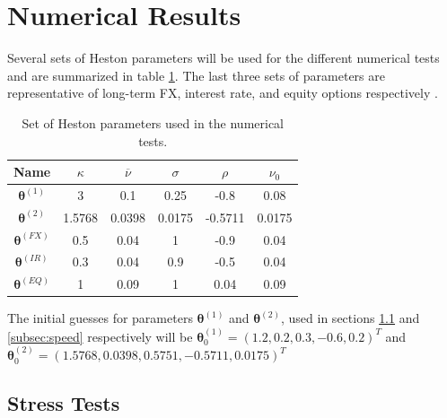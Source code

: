 \documentclass[12,twoside]{mammeTFM}
\theoremstyle{definition}
\theoremstyle{remark}
\begin{document}


\section{Numerical Results} \label{chapter:results}

Several sets of Heston parameters will be used for the different numerical tests and are summarized in table \ref{table:heston_params}. The last three sets of parameters are representative of long-term FX, interest rate, and equity options respectively \cite{and08}.

\begin{table}[h]
\begin{center}
 \begin{tabular}{|c | c | c | c | c | c |} 
 \hline
 Name & $\kappa$ & $\overline{\nu}$ & $\sigma$ & $\rho$ & $\nu_0$ \\ [0.5ex] 
 \hline
 $\boldsymbol{\theta}^{(1)}$ & 3 & 0.1 & 0.25 & -0.8 & 0.08 \\ 
 \hline
 $\boldsymbol{\theta}^{(2)}$ & 1.5768 & 0.0398 & 0.0175 & -0.5711 & 0.0175 \\ 
 \hline
 $\boldsymbol{\theta}^{(FX)}$ & 0.5 & 0.04 & 1 & -0.9 & 0.04 \\ 
 \hline
 $\boldsymbol{\theta}^{(IR)}$ & 0.3 & 0.04 & 0.9 & -0.5 & 0.04 \\ 
 \hline
 $\boldsymbol{\theta}^{(EQ)}$ & 1 & 0.09 & 1 & 0.04 & 0.09 \\ 
 \hline
\end{tabular}
\end{center}
\caption{Set of Heston parameters used in the numerical tests.}\label{table:heston_params}
\end{table}

The initial guesses for parameters $\boldsymbol{\theta}^{(1)}$ and $\boldsymbol{\theta}^{(2)}$, used in sections \ref{subsec:stress} and \ref{subsec:speed} respectively will be $\boldsymbol{\theta}^{(1)}_{0} = (1.2, 0.2, 0.3, -0.6, 0.2)^{T}$ and $\boldsymbol{\theta}^{(2)}_{0} = (1.5768, 0.0398, 0.5751, -0.5711, 0.0175)^{T}$

\subsection{Stress Tests}\label{subsec:stress}
\end{document}
